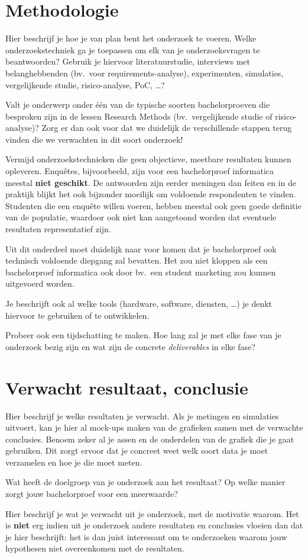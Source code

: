 \section{Methodologie}%
\label{sec:methodologie}


Hier beschrijf je hoe je van plan bent het onderzoek te voeren. Welke onderzoekstechniek ga je toepassen om elk van je onderzoeksvragen te beantwoorden? Gebruik je hiervoor literatuurstudie, interviews met belanghebbenden (bv.~voor requirements-analyse), experimenten, simulaties, vergelijkende studie, risico-analyse, PoC, \ldots?

Valt je onderwerp onder één van de typische soorten bachelorproeven die besproken zijn in de lessen Research Methods (bv.\ vergelijkende studie of risico-analyse)? Zorg er dan ook voor dat we duidelijk de verschillende stappen terug vinden die we verwachten in dit soort onderzoek!

Vermijd onderzoekstechnieken die geen objectieve, meetbare resultaten kunnen opleveren. Enquêtes, bijvoorbeeld, zijn voor een bachelorproef informatica meestal \textbf{niet geschikt}. De antwoorden zijn eerder meningen dan feiten en in de praktijk blijkt het ook bijzonder moeilijk om voldoende respondenten te vinden. Studenten die een enquête willen voeren, hebben meestal ook geen goede definitie van de populatie, waardoor ook niet kan aangetoond worden dat eventuele resultaten representatief zijn.

Uit dit onderdeel moet duidelijk naar voor komen dat je bachelorproef ook technisch voldoen\-de diepgang zal bevatten. Het zou niet kloppen als een bachelorproef informatica ook door bv.\ een student marketing zou kunnen uitgevoerd worden.

Je beschrijft ook al welke tools (hardware, software, diensten, \ldots) je denkt hiervoor te gebruiken of te ontwikkelen.

Probeer ook een tijdschatting te maken. Hoe lang zal je met elke fase van je onderzoek bezig zijn en wat zijn de concrete \emph{deliverables} in elke fase?

\section{Verwacht resultaat, conclusie}%
\label{sec:verwachte_resultaten}

Hier beschrijf je welke resultaten je verwacht. Als je metingen en simulaties uitvoert, kan je hier al mock-ups maken van de grafieken samen met de verwachte conclusies. Benoem zeker al je assen en de onderdelen van de grafiek die je gaat gebruiken. Dit zorgt ervoor dat je concreet weet welk soort data je moet verzamelen en hoe je die moet meten.

Wat heeft de doelgroep van je onderzoek aan het resultaat? Op welke manier zorgt jouw bachelorproef voor een meerwaarde?

Hier beschrijf je wat je verwacht uit je onderzoek, met de motivatie waarom. Het is \textbf{niet} erg indien uit je onderzoek andere resultaten en conclusies vloeien dan dat je hier beschrijft: het is dan juist interessant om te onderzoeken waarom jouw hypothesen niet overeenkomen met de resultaten.


